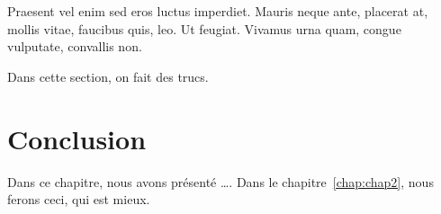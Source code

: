 Praesent vel enim sed eros luctus imperdiet. Mauris neque ante, placerat at,
mollis vitae, faucibus quis, leo. Ut feugiat. Vivamus urna quam, congue
vulputate, convallis non.

\begin{encadre}
  Dans cette section, on fait des trucs.
\end{encadre}


\section{Conclusion}

Dans ce chapitre, nous avons présenté \ldots.
Dans le chapitre~\ref{chap:chap2}, nous ferons ceci, qui est mieux.

\outroformatting
